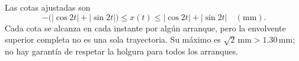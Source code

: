 Las cotas ajustadas son
\[
-\bigl(|\cos2t|+|\sin2t|\bigr)\le x(t)\le
|\cos2t|+|\sin2t|\quad(\mathrm{mm}).
\]
Cada cota se alcanza en cada instante por algún arranque, pero la envolvente superior completa no es una sola trayectoria. Su máximo es \(\sqrt2\,\mathrm{mm}>1.30\,\mathrm{mm}\); no hay garantía de respetar la holgura para todos los arranques.
